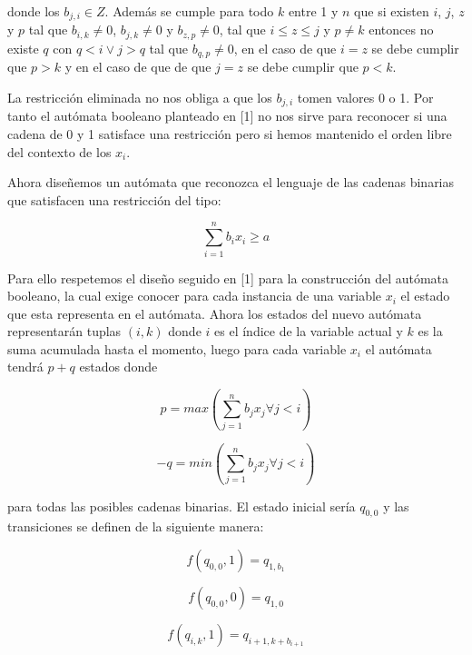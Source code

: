 \documentclass{article}
\begin{document}
donde los $b_{j,i}\in Z$. Además se cumple para todo $k$ entre 1 y $n$ que si existen $i$, $j$, $z$ y $p$ tal que $b_{i,k} \neq 0$, $b_{j,k} \neq 0$ y $b_{z,p} \neq 0$, tal que $i\leq z\leq j$ y $p\neq k$ entonces no existe $q$ con $q<i \lor j>q$ tal que $b_{q,p}\neq 0$, 
en el caso de que $i=z$ se debe cumplir que $p>k$ y en el caso de que de que $j=z$ se debe cumplir que $p<k$.

La restricción eliminada no nos obliga a que los $b_{j,i}$ tomen valores 0 o 1. Por tanto el autómata booleano planteado en [1] no nos sirve para
reconocer si una cadena de 0 y 1 satisface una restricción pero si hemos mantenido el orden libre del contexto de los $x_i$.

Ahora diseñemos un autómata que reconozca el lenguaje de las cadenas binarias que satisfacen una restricción del tipo:

\begin{equation}
    \sum_{i = 1}^{n} b_{i}x_i \geq a
\end{equation}

Para ello respetemos el diseño seguido en [1] para la construcción del autómata booleano, la cual exige conocer para cada instancia de una variable
$x_i$ el estado que esta representa en el autómata. Ahora los estados del nuevo autómata representarán tuplas $(i,k)$ donde $i$ es el índice de la variable
actual y $k$ es la suma acumulada hasta el momento, luego para cada variable $x_i$ el autómata tendrá $p+q$ estados donde 

\begin{equation}
    p=max(\sum_{j = 1}^{n} b_{j}x_j \forall j<i)    
\end{equation}

\begin{equation}
    -q=min(\sum_{j = 1}^{n} b_{j}x_j \forall j<i)    
\end{equation}

para todas las posibles cadenas binarias. El estado inicial sería $q_{0,0}$ y las transiciones se definen de la siguiente manera:

\begin{equation}
    f(q_{0,0},1)=q_{1,b_{1}}
\end{equation}

\begin{equation}
    f(q_{0,0},0)=q_{1,0}
\end{equation}

\begin{equation}
    f(q_{i,k},1)=q_{i+1,k+b_{i+1}}
\end{equation}
\end{document}
